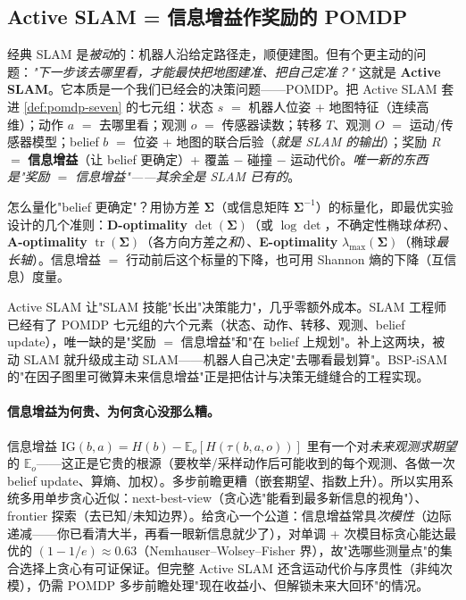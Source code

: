 \subsection{Active SLAM = 信息增益作奖励的 POMDP}
\label{sec:pomdp-active}

经典 SLAM 是\emph{被动}的：机器人沿给定路径走，顺便建图。但有个更主动的问题：\emph{"下一步该去哪里看，才能最快把地图建准、把自己定准？"} 这就是 \textbf{Active SLAM}。它本质是一个我们已经会的决策问题——POMDP。把 Active SLAM 套进 \cref{def:pomdp-seven} 的七元组：状态 $s$ $=$ 机器人位姿 + 地图特征（连续高维）；动作 $a$ $=$ 去哪里看；观测 $o$ $=$ 传感器读数；转移 $T$、观测 $O$ $=$ 运动/传感器模型；belief $b$ $=$ 位姿 + 地图的联合后验（\emph{就是 SLAM 的输出}）；奖励 $R$ $=$ \textbf{信息增益}（让 belief 更确定）+ 覆盖 $-$ 碰撞 $-$ 运动代价。\emph{唯一新的东西是"奖励 $=$ 信息增益"——其余全是 SLAM 已有的}。

怎么量化"belief 更确定"？用协方差 $\boldsymbol{\Sigma}$（或信息矩阵 $\boldsymbol{\Sigma}^{-1}$）的标量化，即最优实验设计的几个准则：\textbf{D-optimality} $\det(\boldsymbol{\Sigma})$（或 $\log\det$，不确定性椭球\emph{体积}）、\textbf{A-optimality} $\operatorname{tr}(\boldsymbol{\Sigma})$（各方向方差之\emph{和}）、\textbf{E-optimality} $\lambda_{\max}(\boldsymbol{\Sigma})$（椭球\emph{最长轴}）。信息增益 $=$ 行动前后这个标量的下降，也可用 Shannon 熵的下降（互信息）度量\cite{placed2023survey}。

\begin{insight}
Active SLAM 让"SLAM 技能"长出"决策能力"，几乎零额外成本。SLAM 工程师已经有了 POMDP 七元组的六个元素（状态、动作、转移、观测、belief update），唯一缺的是"奖励 $=$ 信息增益"和"在 belief 上规划"。补上这两块，被动 SLAM 就升级成主动 SLAM——机器人自己决定"去哪看最划算"。BSP-iSAM 的"在因子图里可微算未来信息增益"正是把估计与决策无缝缝合的工程实现。
\end{insight}

\paragraph{信息增益为何贵、为何贪心没那么糟。}
信息增益 $\mathrm{IG}(b,a)=H(b)-\mathbb{E}_o[H(\tau(b,a,o))]$ 里有一个对\emph{未来观测求期望}的 $\mathbb{E}_o$——这正是它贵的根源（要枚举/采样动作后可能收到的每个观测、各做一次 belief update、算熵、加权）。多步前瞻更糟（嵌套期望、指数上升）。所以实用系统多用单步贪心近似：next-best-view（贪心选"能看到最多新信息的视角"）、frontier 探索（去已知/未知边界）。给贪心一个公道：信息增益常具\emph{次模性}（边际递减——你已看清大半，再看一眼新信息就少了），对单调 + 次模目标贪心能达最优的 $(1-1/e)\approx0.63$（Nemhauser--Wolsey--Fisher 界），故"选哪些测量点"的集合选择上贪心有可证保证。但完整 Active SLAM 还含运动代价与序贯性（非纯次模），仍需 POMDP 多步前瞻处理"现在收益小、但解锁未来大回环"的情况。

